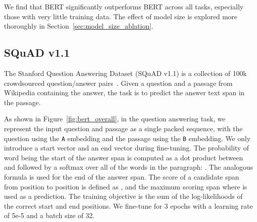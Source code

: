 \documentclass[11pt,a4paper]{article}
\newcommand{\eat}[1]{\ignorespaces}
\newcommand\bertbase{BERT\xspace}
\newcommand\bertlarge{BERT\xspace}
\begin{document}
We find that \bertlarge significantly outperforms \bertbase across all tasks, especially those with very little training data. The effect of model size is explored more thoroughly in Section~\ref{sec:model_size_ablation}.

\subsection{SQuAD v1.1}
\label{sec:squad}

The Stanford Question Answering Dataset (SQuAD v1.1) is a collection of 100k crowdsourced question/answer pairs~\cite{rajpurkar-etal:2016:_squad}. Given a question and a passage from Wikipedia containing the answer, the task is to predict the answer text span in the passage. 

\eat{
For example: 

\begin{itemize}
\item Input Question: \\{\tt {\scriptsize  Where do water droplets collide with ice crystals to form precipitation?}}
\item Input Paragraph: \\{\tt {\scriptsize  ... Precipitation forms as smaller droplets coalesce via collision with other rain drops or ice crystals within a cloud. ...}}
\item Output Answer: \\ {\tt {\scriptsize  within a cloud}}
\end{itemize}
}

As shown in Figure~\ref{fig:bert_overall}, in the question answering task,
we represent the input question and passage as a single packed sequence, with the question using the {\tt A} embedding and the passage using the {\tt B} embedding. We only introduce a start vector  and an end vector  during fine-tuning.
The probability of word  being the start of the answer span is computed as a dot product between  and  followed by a softmax over all of the words in the paragraph: . The analogous formula is used for the end of the answer span. The score of a candidate span from position  to position  is defined as  , and the maximum scoring span where  is used as a prediction. The training objective is the sum of the log-likelihoods of the correct start and end positions. We fine-tune for 3 epochs with a learning rate of 5e-5 and a batch size of 32. 
\end{document}
